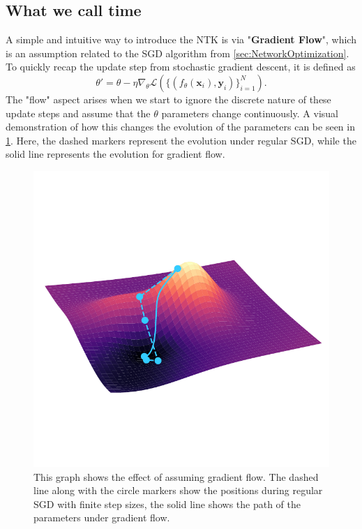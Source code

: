 \subsection{What we call time}
A simple and intuitive way to introduce the NTK is via "\textbf{Gradient Flow}", which is an assumption related to the SGD algorithm from \cref{sec:NetworkOptimization}. To quickly recap the update step from stochastic gradient descent, it is defined as 
\begin{equation}
	\theta' = \theta - \eta \nabla_\theta \mathscr{L}\left( \{(f_\theta(\mathbf{x}_i), \mathbf{y}_i)\}_{i=1}^{N} \right).
\end{equation}
The "flow" aspect arises when we start to ignore the discrete nature of these update steps and assume that the $\theta$ parameters change continuously. A visual demonstration of how this changes the evolution of the parameters can be seen in \cref{fig:GradientFlowPlot}. Here, the dashed markers represent the evolution under regular SGD, while the solid line represents the evolution for gradient flow.
\begin{figure}
	\centering
	\includegraphics[width=12cm, clip, trim = 0cm 2.3cm 0cm 3.5cm]{text/NTK/GradientFlowPlot.pdf}
	\caption{This graph shows the effect of assuming gradient flow. The dashed line along with the circle markers show the positions during regular SGD with finite step sizes, the solid line shows the path of the parameters under gradient flow.}
	\label{fig:GradientFlowPlot}
\end{figure}
